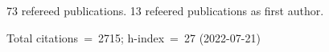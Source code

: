 73 refereed publications. 13 refeered publications as first author.

Total citations~=~2715; h-index~=~27 (2022-07-21)